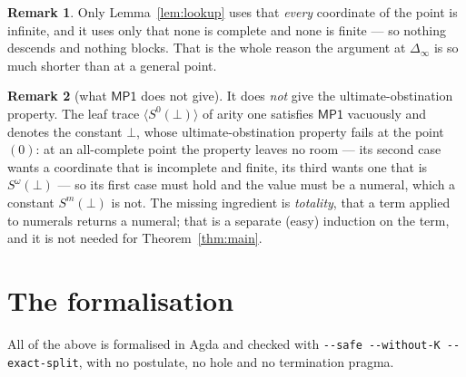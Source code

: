 \documentclass[11pt]{article}
\newcommand{\Sw}{S^{\omega}(\bot)}
\newcommand{\MP}{\mathsf{MP1}}
\theoremstyle{definition}
\newtheorem{remark}{Remark}
\begin{document}
\begin{remark}
Only Lemma~\ref{lem:lookup} uses that \emph{every} coordinate of the point
is infinite, and it uses only that none is complete and none is finite ---
so nothing descends and nothing blocks. That is the whole reason the
argument at $\Delta_\infty$ is so much shorter than at a general point.
\end{remark}

\begin{remark}[what $\MP$ does not give]
\label{rem:notuo}
It does \emph{not} give the ultimate-obstination property. The leaf trace
$\langle S^0(\bot)\rangle$ of arity one satisfies $\MP$ vacuously and
denotes the constant $\bot$, whose ultimate-obstination property fails at
the point $(0)$: at an all-complete point the property leaves no room ---
its second case wants a coordinate that is incomplete and finite, its
third wants one that is $\Sw$ --- so its first case must hold and the
value must be a numeral, which a constant $S^m(\bot)$ is not. The missing
ingredient is \emph{totality}, that a term applied to numerals returns a
numeral; that is a separate (easy) induction on the term, and it is not
needed for Theorem~\ref{thm:main}.
\end{remark}

\section{The formalisation}

All of the above is formalised in Agda and checked with
\verb|--safe --without-K --exact-split|, with no postulate, no hole and no
termination pragma.
\end{document}
